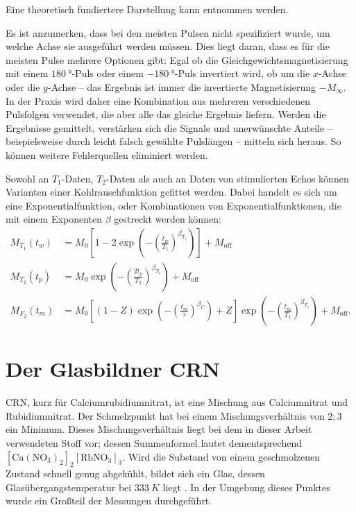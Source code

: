 Eine theoretisch fundiertere Darstellung kann \cite[insb. Kap. 6.2 und 10.2.3]{schmidt-rohr_multidimensional_1994} entnommen werden.

Es ist anzumerken, dass bei den meisten Pulsen nicht spezifiziert wurde, um welche Achse sie ausgeführt werden müssen. Dies liegt daran, dass es für die meisten Pulse mehrere Optionen gibt: Egal ob die Gleichgewichtsmagnetisierung mit einem $\SI{180}{\degree}$-Puls oder einem $\SI{-180}{\degree}$-Puls invertiert wird, ob um die $x$-Achse oder die $y$-Achse -- das Ergebnis ist immer die invertierte Magnetisierung $-M_\infty$. In der Praxis wird daher eine Kombination aus mehreren verschiedenen Pulsfolgen verwendet, die aber alle das gleiche Ergebnis liefern. Werden die Ergebnisse gemittelt, verstärken sich die Signale und unerwünschte Anteile -- beispielsweise durch leicht falsch gewählte Pulslängen -- mitteln sich heraus. So können weitere Fehlerquellen eliminiert werden.


Sowohl an $T_1$-Daten, $T_2$-Daten als auch an Daten von stimulierten Echos können Varianten einer Kohlrauschfunktion gefittet werden. Dabei handelt es sich um eine Exponentialfunktion, oder Kombinationen von Exponentialfunktionen, die mit einem Exponenten $\beta$ gestreckt werden können:
\begin{align}
	M_{T_1} (t_w) & = M_0 \left[ 1 - 2 \exp{ \left(- { \left( \frac{t_w}{T_1} \right) }^{\beta_{T_1}} \right)} \right] + M_\text{off} \label{eqn:theo:T_1_fit}                                                                     \\
	M_{T_2} (t_p) & = M_0 \exp{ \left(- { \left( \frac{2 t_p}{T_2} \right) }^{\beta_{T_2}} \right)} + M_\text{off} \label{eqn:theo:T_2_fit}                                                                                        \\
	M_{F_2} (t_m) & = M_0 \left[  \left(1 - Z\right) \exp\left(- \left(\frac{t_m}{\tau}\right)^{\beta_C}\right) + Z \right] \exp\left(- \left(\frac{t_m}{T_1}\right)^{\beta_{T_1}}\right) + M_\text{off}. \label{eqn:theo:F_2_fit}
\end{align}



\section{Der Glasbildner CRN} \label{section:theo:crn}

CRN, kurz für Calciumrubidiumnitrat, ist eine Mischung aus Calciumnitrat und Rubidiumnitrat. Der Schmelzpunkt hat bei einem Mischungsverhältnis von $2 : 3$ ein Minimum. Dieses Mischungsverhältnis liegt bei dem in dieser Arbeit verwendeten Stoff vor; dessen Summenformel lautet dementsprechend $[\text{Ca}(\text{NO}_\text{3})_\text{2}]_\text{2}[\text{RbNO}_\text{3}]_\text{3}$. Wird die Substand von einem geschmolzenen Zustand schnell genug abgekühlt, bildet sich ein Glas, dessen Glasübergangstemperatur bei $\SI{333}{K}$ liegt \cite{PIMENOV199793}. In der Umgebung dieses Punktes wurde ein Großteil der Messungen durchgeführt.

